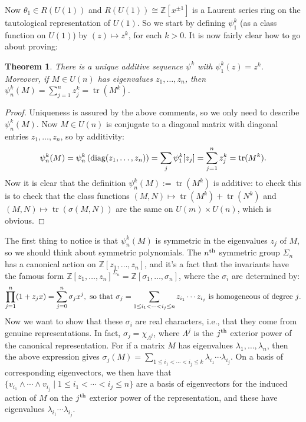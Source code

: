 \documentclass{article}
\newcommand{\Z}{\mathbb{Z}}
\DeclareMathOperator{\tr}{tr}
\renewcommand{\mapsto}{\longmapsto}
\newtheorem{thm}{Theorem}[section]
\theoremstyle{definition}
\begin{document}
Now $\theta_1 \in R(U(1))$ and $R(U(1)) \cong \Z[x^{\pm 1}]$ is a Laurent series ring on the tautological representation of $U(1)$.  So we start by defining $\psi_1^k$ (as a class function on $U(1)$) by $(z)\mapsto z^k$, for each $k > 0$.  It is now fairly clear how to go about proving:
\begin{thm}
There is a unique additive sequence $\psi^k$ with $\psi^k_1(z) = z^k$. Moreover, if $M\in U(n)$ has eigenvalues $z_1,\ldots,z_n$, then $\psi_n^k(M)=\sum_{j=1}^n z^k_j=\tr(M^k)$.
\end{thm}
\begin{proof}
Uniqueness is assured by the above comments, so we only need to describe $\psi_n^k(M)$. Now $M \in U(n)$ is conjugate to a diagonal matrix with diagonal entries $z_1, \ldots, z_n$, so by additivity:
\[\psi^k_n(M) = \psi^k_n \left( \textup{diag}(z_1,\ldots,z_n)\right) = \sum_j \psi^k_1 [z_j] = \sum_{j=1}^n z_j^k = \tr(M^k).\]
Now it is clear that the definition $\psi^k_n(M):=\tr(M^k)$ is additive: to check this is to check that the class functions $(M,N)\mapsto \tr(M^k)+\tr(N^k)$ and $(M,N)\mapsto \tr(\sigma(M,N))$ are the same on $U(m)\times U(n)$, which is obvious.
\end{proof}
The first thing to notice is that $\psi^k_n(M)$ is symmetric in the eigenvalues $z_j$ of $M$, so we should think about symmetric polynomials. The $n^\textup{th}$ symmetric group $\Sigma_n$ has a canonical action on $\Z[z_1, \ldots, z_n]$, and it's a fact that the invariants have the famous form $\Z[z_1, \ldots, z_n]^{\Sigma_n} = \Z[\sigma_1, \ldots, \sigma_n]$, where the $\sigma_i$ are determined by:
\[\prod_{j=1}^n (1+z_j x) = \sum_{j=0}^n \sigma_j x^j,\textup{ so that }
\sigma_j = \sum_{ 1\leq i_1 < \cdots < i_j\leq n }z_{i_1}\cdots z_{i_j}\text{ is homogeneous of degree $j$.}\]
Now we want to show that these $\sigma_i$ are real characters, i.e., that they come from genuine representations.  In fact, $\sigma_j = \chi_{\Lambda^j}$, where $\Lambda^j$ is the $j^\textup{th}$ exterior
power of the canonical representation.  
For if a matrix $M$ has eigenvalues $\lambda_1, \ldots, \lambda_n$, then the above expression gives $\sigma_j(M) = \sum_{1 \le i_1 < \cdots < i_j \le k} \lambda_{i_1} \cdots \lambda_{i_j}$.  On a basis of corresponding eigenvectors, we then have that $\{v_{i_1} \wedge \cdots \wedge v_{i_j} \mid 1 \le i_1 < \cdots < i_j \le n\}$ are a basis of eigenvectors for the induced action of $M$ on the $j^\textup{th}$ exterior power of the representation, and these have eigenvalues $\lambda_{i_1} \cdots \lambda_{i_j}$.
\end{document}
